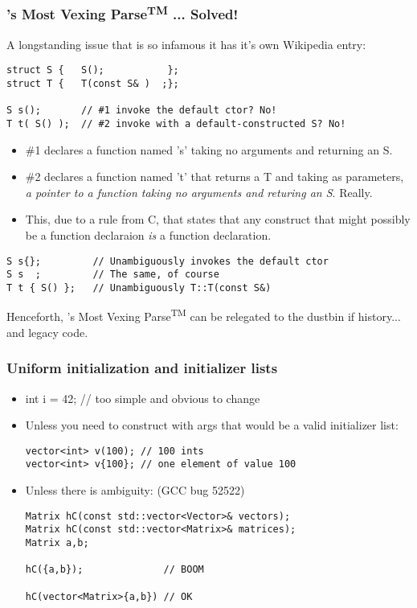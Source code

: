 \begin{frame}[fragile,t]
\frametitle{\CC's Most Vexing Parse\textsuperscript{TM} ... Solved!}
A longstanding issue that is so infamous it has it's own Wikipedia
entry:
{\scriptsize\begin{verbatim}
struct S {   S();           };
struct T {   T(const S& )  ;};

S s();       // #1 invoke the default ctor? No!
T t( S() );  // #2 invoke with a default-constructed S? No!
\end{verbatim}

\begin{itemize}
\item \#1 declares a function named 's' taking no arguments and
  returning an S.
\item \#2 declares a function named 't' that returns a T and taking as parameters, \emph{a pointer to
  a function taking no arguments and returing an S}.  Really.
\item This, due to a rule from C, that states that any construct that
  might possibly be a function declaraion \emph{is} a function
  declaration.
\end{itemize}

\begin{verbatim}
S s{};         // Unambiguously invokes the default ctor
S s  ;         // The same, of course
T t { S() };   // Unambiguously T::T(const S&)
\end{verbatim}
}
Henceforth, \CC's Most Vexing Parse\textsuperscript{TM} can be
relegated to the dustbin if history... and legacy code.
\end{frame}




\begin{frame}[fragile,t]
\frametitle{Uniform initialization and initializer lists}
\begin{itemize}
\item int i = 42; // too simple and obvious to change
\vskip 6pt
\item Unless you need to construct with args that would be a valid initializer list: 
\begin{verbatim}
vector<int> v(100); // 100 ints
vector<int> v{100}; // one element of value 100
\end{verbatim}
\vskip 6pt
\item Unless there is ambiguity: (GCC bug 52522)
\begin{verbatim}
Matrix hC(const std::vector<Vector>& vectors);
Matrix hC(const std::vector<Matrix>& matrices);
Matrix a,b;

hC({a,b});              // BOOM

hC(vector<Matrix>{a,b}) // OK

\end{verbatim}
\end{itemize}
\end{frame}


